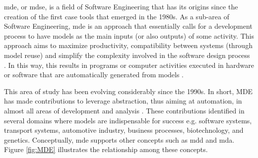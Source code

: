\ac{mde}, or \ac{mdse}, is a field of Software Engineering that has its origins since the creation of the first \ac{case} tools that emerged in the 1980s.
As a sub-area of Software Engineering, \ac{mde} is an approach that essentially calls for a development process to have models as the main inputs (or also outputs) of some activity.
This approach aims to maximize productivity, compatibility between systems (through model reuse) and simplify the complexity involved in the software design process  \cite{Brambilla:2017}.
In this way, this results in programs or computer activities executed in hardware or software that are automatically generated from models \cite{Sommerville:2015}.

This area of study has been evolving considerably since the 1990s.
In short, MDE has made contributions to leverage abstraction, thus aiming at automation, in almost all areas of development and analysis \cite{Bucchiarone:2020}.
These contributions identified in several domains where models are indispensable for success e.g. software systems, transport systems, automotive industry, business processes, biotechnology, and genetics.
Conceptually, \ac{mde} supports other concepts such as \ac{mdd} and \ac{mda}. 
Figure \ref{fig:MDE} illustrates the relationship among these concepts.

